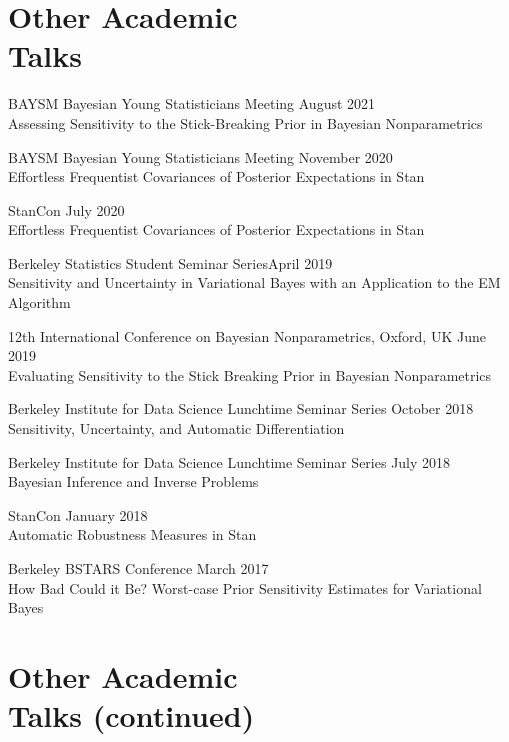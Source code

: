 \documentclass[margin,line]{res}
\begin{document}
\begin{resume}


\section{\sc Other Academic\\Talks}

BAYSM Bayesian Young Statisticians Meeting
\hfill August 2021\\
Assessing Sensitivity to the Stick-Breaking Prior in Bayesian Nonparametrics

BAYSM Bayesian Young Statisticians Meeting
\hfill November 2020\\
Effortless Frequentist Covariances of Posterior Expectations in Stan

StanCon \hfill July 2020\\
Effortless Frequentist Covariances of Posterior Expectations in Stan

Berkeley Statistics Student Seminar Series\hfill April 2019\\
Sensitivity and Uncertainty in Variational Bayes with an Application to the
EM Algorithm

12th International Conference on Bayesian Nonparametrics, Oxford, UK
\hfill June 2019\\
Evaluating Sensitivity to the Stick Breaking Prior in Bayesian Nonparametrics

Berkeley Institute for Data Science Lunchtime Seminar Series \hfill October 2018\\
Sensitivity, Uncertainty, and Automatic Differentiation

Berkeley Institute for Data Science Lunchtime Seminar Series \hfill July 2018\\
Bayesian Inference and Inverse Problems

StanCon \hfill January 2018\\
Automatic Robustness Measures in Stan


Berkeley BSTARS Conference \hfill March 2017\\
How Bad Could it Be?  Worst-case Prior Sensitivity Estimates for Variational Bayes

\clearpage
\section{\sc Other Academic\\Talks (continued)}


\end{resume}
\end{document}
